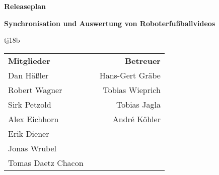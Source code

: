 \begin{titlepage}
\begin{center}
{\Huge\textbf{Releaseplan}\vspace{2em}}

{\Large\textbf{Synchronisation und Auswertung von Roboterfußballvideos}\vspace{1em}}

{\textsf{tj18b}\vspace{2em}}

\begin{table}[b]
\begin{tabularx}{\textwidth}{lXr}
\textbf{Mitglieder}&&\textbf{Betreuer}\\
Dan Häßler&&Hans-Gert Gräbe\\
Robert Wagner&&Tobias Wieprich\\
Sirk Petzold&&Tobias Jagla\\
Alex Eichhorn&&André Köhler\\
Erik Diener&&\\
Jonas Wrubel&&\\
Tomas Daetz Chacon&&\\
\end{tabularx}
\end{table}
\end{center}
\end{titlepage}
